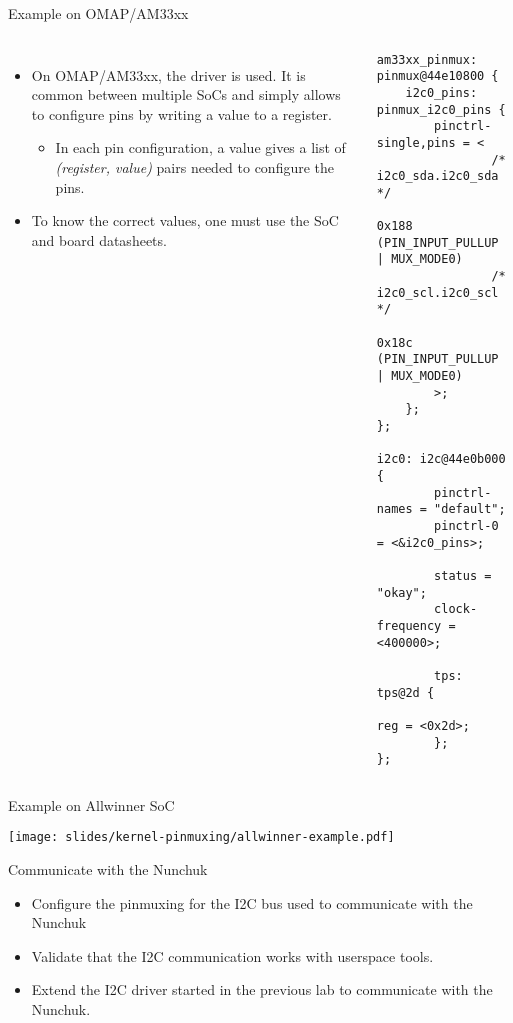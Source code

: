 \begin{frame}[fragile]{Example on OMAP/AM33xx}
  \begin{columns}
    \begin{itemize}
      \small
    \item On OMAP/AM33xx, the  driver is used. It
      is common between multiple SoCs and simply allows to configure
      pins by writing a value to a register.
      \begin{itemize}
      \item In each pin configuration, a  value
        gives a list of {\em (register, value)} pairs needed to configure
        the pins.
      \end{itemize}
    \item To know the correct values, one must use the SoC and board
      datasheets.
    \end{itemize}
    \begin{verbatim}
am33xx_pinmux: pinmux@44e10800 {
    i2c0_pins: pinmux_i2c0_pins {
        pinctrl-single,pins = <
                /* i2c0_sda.i2c0_sda */
                0x188 (PIN_INPUT_PULLUP | MUX_MODE0)
                /* i2c0_scl.i2c0_scl */
                0x18c (PIN_INPUT_PULLUP | MUX_MODE0)
        >;
    };
};

i2c0: i2c@44e0b000 {
        pinctrl-names = "default";
        pinctrl-0 = <&i2c0_pins>;

        status = "okay";
        clock-frequency = <400000>;

        tps: tps@2d {
                reg = <0x2d>;
        };
};
    \end{verbatim}
  \end{columns}
\end{frame}

\begin{frame}[fragile]{Example on Allwinner SoC}
  \begin{center}
    \texttt{[image: slides/kernel-pinmuxing/allwinner-example.pdf]}
  \end{center}
\end{frame}

\setuplabframe
{Communicate with the Nunchuk}
{
  \begin{itemize}
  \item Configure the pinmuxing for the I2C bus used to communicate
    with the Nunchuk
  \item Validate that the I2C communication works with userspace
    tools.
  \item Extend the I2C driver started in the previous lab to
    communicate with the Nunchuk.
  \end{itemize}
}
